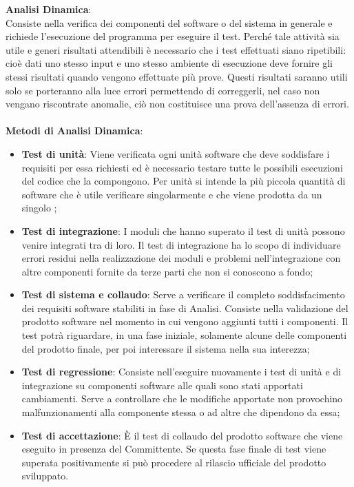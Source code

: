 \textbf{Analisi Dinamica}:\medskip \\
Consiste nella verifica dei componenti del software o del sistema in generale e richiede l'esecuzione del programma per eseguire il test.
Perché tale attività sia utile e generi risultati attendibili è necessario che i test effettuati siano ripetibili: cioè dati uno stesso input e uno stesso ambiente di esecuzione deve fornire gli stessi risultati quando vengono effettuate più prove. Questi risultati saranno utili solo se porteranno alla luce errori permettendo di correggerli, nel caso non vengano riscontrate anomalie, ciò non costituisce una prova dell'assenza di errori.
\\ \\ \textbf{Metodi di Analisi Dinamica}:
\begin{itemize}
	\item \textbf{Test di unità}:
	Viene verificata ogni unità software che deve soddisfare i requisiti per essa richiesti ed è necessario testare tutte le possibili esecuzioni del codice che la compongono. Per unità si intende la più piccola quantità di software che è utile verificare singolarmente e che viene prodotta da un singolo \ruoloProgrammatore;
	\item \textbf{Test di integrazione}:
	I moduli che hanno superato il test di unità possono
	venire integrati tra di loro. Il test di integrazione ha lo scopo di individuare errori residui nella realizzazione dei moduli e problemi nell'integrazione con altre componenti fornite da terze parti che non si conoscono a fondo;
	\item \textbf{Test di sistema e collaudo}:
	Serve a verificare il completo soddisfacimento dei requisiti software stabiliti in fase di Analisi. Consiste nella validazione del prodotto software nel momento in cui vengono aggiunti tutti i componenti. Il test potrà riguardare, in una fase iniziale, solamente alcune delle componenti del prodotto finale, per poi interessare il sistema nella sua interezza;
	\item \textbf{Test di regressione}:
	Consiste nell'eseguire nuovamente i test di unità e di integrazione su componenti software alle quali sono stati apportati cambiamenti. Serve a  controllare che le modifiche apportate non provochino malfunzionamenti alla componente stessa o ad altre che dipendono da essa;
	\item \textbf{Test di accettazione}:
	È il test di collaudo del prodotto software che viene eseguito in presenza del Committente. Se questa fase finale di test viene superata positivamente si può procedere al rilascio ufficiale del prodotto sviluppato.
\end{itemize}
\newpage
